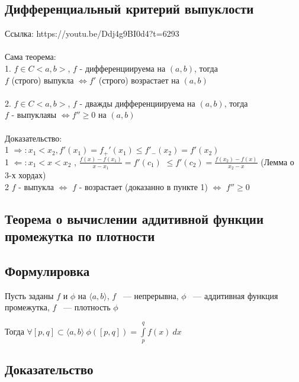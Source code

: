 \documentclass[../main.tex]{subfiles}
\begin{document}
\subsection{Дифференциальный критерий выпуклости}
Ссылка:
https://youtu.be/Ddj4g9BI0d4?t=6293 \\ \\
Сама теорема: \\ 
1. $f \in C<a, b>$, $f$ - дифференциируема на $(a, b)$, тогда \\
\indent $f$ (строго) выпукла $\Leftrightarrow f'$ (строго) возрастает на $(a, b)$ \\ \\
2. $f \in C<a, b>$, $f$ - дважды дифференциируема на $(a, b)$, тогда \\
\indent $f$ - выпуклаяы $\Leftrightarrow f'' \geq 0$ на $(a, b)$ \\ \\
Доказательство: \\
1 $\Rightarrow: x_1 < x_2, f'(x_1) = f_{+}' (x_1) \leq f'_{-}(x_2) = f'(x_2)$  \\
1 $\Leftarrow: x_1 < x < x_2$ , $\frac{f(x) - f(x_1)}{x - x_1} = f'(c_1)$  $ \leq f'(c_2)= \frac{f(x_2) - f(x)}{x_2 - x}$ (Лемма о 3-х хордах) \\
2 $f$ - выпукла $\Leftrightarrow$ $f$ - возрастает (доказанно в пункте 1) $\Leftrightarrow$ $f'' \geq 0$
\newpage

\subsection{Теорема о вычислении аддитивной функции промежутка по плотности}

        \subsection*{Формулировка}
        
            Пусть заданы $f$ и $\phi$ на $\langle a, b \rangle$, $f$ ~--- непрерывна, $\phi$ ~--- аддитивная функция промежутка, $f$ ~--- плотность $\phi$
            
            Тогда $\forall [p, q] \subset \langle a, b \rangle \ \phi([p, q]) = \int\limits^q_p f(x) \ dx$
            
        \subsection*{Доказательство}
        
\end{document}
